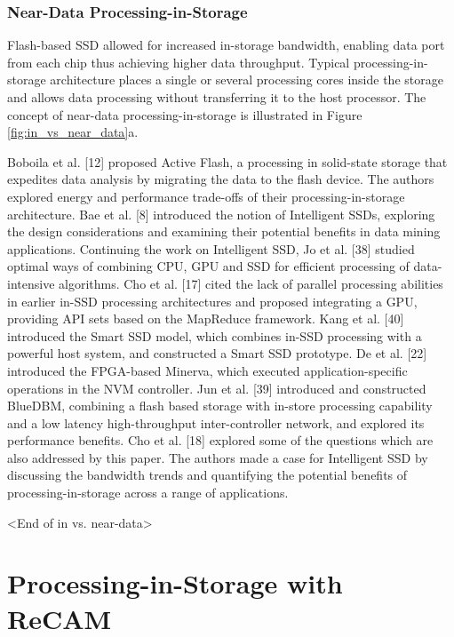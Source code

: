 \documentclass{superfri}
\begin{document}
\subsubsection{Near-Data Processing-in-Storage}
\label{sec:NDP_PRinS}
Flash-based SSD allowed for increased in-storage bandwidth, enabling data port from each chip thus achieving higher data throughput. Typical processing-in-storage architecture places a single or several processing cores inside the storage and allows data processing without transferring it to the host processor. The concept of near-data processing-in-storage is illustrated in Figure \ref{fig:in_vs_near_data}a. 

Boboila et al. [12] proposed Active Flash, a processing in solid-state storage that expedites data analysis by migrating the data to the flash device. The authors explored energy and performance trade-offs of their processing-in-storage architecture. Bae et al. [8] introduced the notion of Intelligent SSDs, exploring the design considerations and examining their potential benefits in data mining applications. Continuing the work on Intelligent SSD, Jo et al. [38] studied optimal ways of combining CPU, GPU and SSD for efficient processing of data-intensive algorithms. Cho et al. [17] cited the lack of parallel processing abilities in earlier in-SSD processing architectures and proposed integrating a GPU, providing API sets based on the MapReduce framework. Kang et al. [40] introduced the Smart SSD model, which combines in-SSD processing with a powerful host system, and constructed a Smart SSD prototype. De et al. [22] introduced the FPGA-based Minerva, which executed application-specific operations in the NVM controller. Jun et al. [39] introduced and constructed BlueDBM, combining a flash based storage with in-store processing capability and a low latency high-throughput inter-controller network, and explored its performance benefits. Cho et al. [18] explored some of the questions which are also addressed by this paper. The authors made a case for Intelligent SSD by discussing the bandwidth trends and quantifying the potential benefits of processing-in-storage across a range of applications.

<End of in vs. near-data>

\section{Processing-in-Storage with ReCAM}
\label{sec:PRinS_with_ReCAM}
\end{document}
